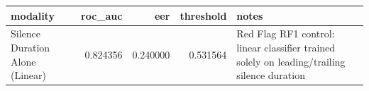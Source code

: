 \begin{tabular}{lrrrl}
\toprule
modality & roc_auc & eer & threshold & notes \\
\midrule
Silence Duration Alone (Linear) & 0.824356 & 0.240000 & 0.531564 & Red Flag RF1 control: linear classifier trained solely on leading/trailing silence duration \\
\bottomrule
\end{tabular}
